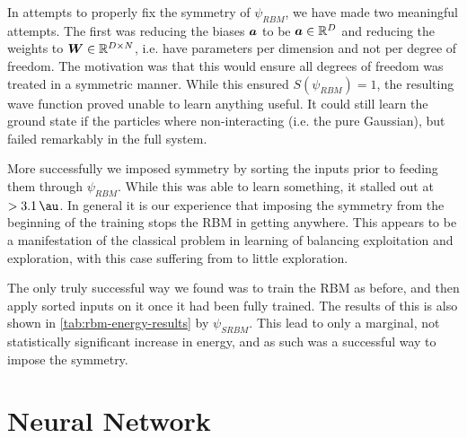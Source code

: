 \documentclass[Thesis.tex]{subfiles}
\begin{document}
In attempts to properly fix the symmetry of $\psi_{RBM}$, we have made two meaningful
attempts. The first was reducing the biases $\bm{a}$ to be $\bm{a}\in\mathbb{R}^D$
and reducing the weights to
$\bm{W}\in\mathbb{R}^{D\times N}$, i.e. have parameters per dimension and not
per degree of freedom. The motivation was that this would ensure all
degrees of freedom was treated in a symmetric manner. While this ensured
$S(\psi_{RBM})=1$, the resulting wave function proved unable to learn anything
useful. It could still learn the ground state if the particles where
non-interacting (i.e. the pure Gaussian), but failed remarkably in the full
system.

More successfully we imposed symmetry by sorting the inputs prior to feeding
them through $\psi_{RBM}$. While this was able to learn something, it stalled
out at $>\SI{3.1}{\au}$. In general it is our experience that imposing the
symmetry from the beginning of the training stops the RBM in getting anywhere.
This appears to be a manifestation of the classical problem in learning of balancing
exploitation and exploration, with this case suffering from to little
exploration.

The only truly successful way we found was to train the RBM as before, and then
apply sorted inputs on it once it had been fully trained. The results of this is
also shown in \cref{tab:rbm-energy-results} by $\psi_{SRBM}$. This lead to only a
marginal, not statistically significant increase in energy, and as such was a
successful way to impose the symmetry.

\section{Neural Network}
\end{document}
